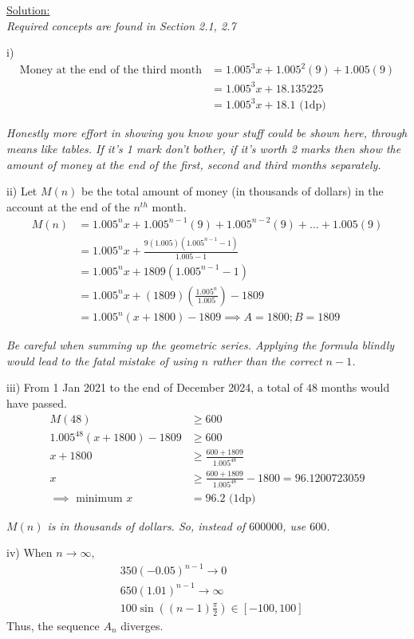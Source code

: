 \documentclass[12pt, a4paper, titlepage]{article}
\begin{document}
\underline{Solution:} \\
\emph{Required concepts are found in Section 2.1, 2.7}

i)
\begin{align*}
    \text{Money at the end of the third month} &= 1.005^3x + 1.005^2(9) + 1.005(9) \\
    &= 1.005^3x + 18.135225 \\
    &= 1.005^3x + 18.1 \text{ (1dp)}
\end{align*}

\emph{Honestly more effort in showing you know your stuff could be shown here, through means like tables. If it's 1 mark don't bother, if it's worth 2 marks then show the amount of money at the end of the first, second and third months separately.}

ii)
Let $M(n)$ be the total amount of money (in thousands of dollars) in the account at the end of the $n^{th}$ month.
\begin{align*}
    M(n) &= 1.005^nx + 1.005^{n - 1}(9) + 1.005^{n - 2}(9) + \dots + 1.005(9) \\
    &= 1.005^nx + \frac{9(1.005)(1.005^{n - 1} - 1)}{1.005 - 1} \\
    &= 1.005^nx + 1809(1.005^{n - 1} - 1) \\
    &= 1.005^nx + (1809)(\frac{1.005^n}{1.005}) - 1809 \\
    &= 1.005^n(x + 1800) - 1809 \implies A = 1800; B = 1809
\end{align*}

\emph{Be careful when summing up the geometric series. Applying the formula blindly would lead to the fatal mistake of using $n$ rather than the correct $n - 1$.}

iii)
From 1 Jan 2021 to the end of December 2024, a total of $48$ months would have passed.
\begin{align*}
    M(48) &\ge 600 \\
    1.005^{48}(x + 1800) - 1809 &\ge 600 \\
    x + 1800 &\ge \frac{600 + 1809}{1.005^48} \\
    x &\ge \frac{600 + 1809}{1.005^48} - 1800 = 96.1200723059 \\
    \implies \text{ minimum } x &= 96.2 \text{ (1dp)}
\end{align*}

\emph{$M(n)$ is in thousands of dollars. So, instead of $600 000$, use $600$.}

iv)
When $n \rightarrow \infty$,
\begin{align*}
    &350(-0.05)^{n - 1} \rightarrow 0 \\
    &650(1.01)^{n - 1} \rightarrow \infty \\
    &100 \sin ((n - 1)\frac{\pi}{2}) \in [-100, 100]
\end{align*}
Thus, the sequence $A_n$ diverges.
\end{document}
